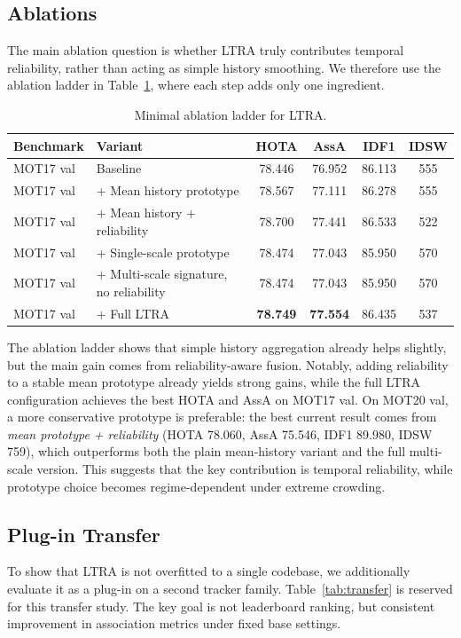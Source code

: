 \subsection{Ablations}
The main ablation question is whether LTRA truly contributes temporal reliability, rather than acting as simple history smoothing. We therefore use the ablation ladder in Table~\ref{tab:ablation_full}, where each step adds only one ingredient.

\begin{table}[t]
\centering
\caption{Minimal ablation ladder for LTRA.}
\label{tab:ablation_full}
\begin{tabular}{llcccc}
\toprule
Benchmark & Variant & HOTA & AssA & IDF1 & IDSW \\
\midrule
MOT17 val & Baseline & 78.446 & 76.952 & 86.113 & 555 \\
MOT17 val & + Mean history prototype & 78.567 & 77.111 & 86.278 & 555 \\
MOT17 val & + Mean history + reliability & 78.700 & 77.441 & 86.533 & 522 \\
MOT17 val & + Single-scale prototype & 78.474 & 77.043 & 85.950 & 570 \\
MOT17 val & + Multi-scale signature, no reliability & 78.474 & 77.043 & 85.950 & 570 \\
MOT17 val & + Full LTRA & \textbf{78.749} & \textbf{77.554} & 86.435 & 537 \\
\bottomrule
\end{tabular}
\end{table}

The ablation ladder shows that simple history aggregation already helps slightly, but the main gain comes from reliability-aware fusion. Notably, adding reliability to a stable mean prototype already yields strong gains, while the full LTRA configuration achieves the best HOTA and AssA on MOT17 val. On MOT20 val, a more conservative prototype is preferable: the best current result comes from \emph{mean prototype + reliability} (HOTA 78.060, AssA 75.546, IDF1 89.980, IDSW 759), which outperforms both the plain mean-history variant and the full multi-scale version. This suggests that the key contribution is temporal reliability, while prototype choice becomes regime-dependent under extreme crowding.

\subsection{Plug-in Transfer}
To show that LTRA is not overfitted to a single codebase, we additionally evaluate it as a plug-in on a second tracker family. Table~\ref{tab:transfer} is reserved for this transfer study. The key goal is not leaderboard ranking, but consistent improvement in association metrics under fixed base settings.

